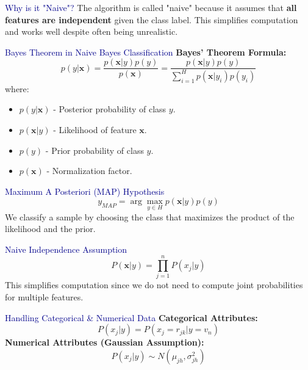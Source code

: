 \begin{frame}{\textcolor{darkblue}{Why is it "Naive"?}}
    The algorithm is called "naive" because it assumes that \textbf{all features are independent} given the class label.  
    This simplifies computation and works well despite often being unrealistic.
\end{frame}

\begin{frame}{\textcolor{darkblue}{Bayes Theorem in Naive Bayes Classification}}
    \textbf{Bayes' Theorem Formula:}
    \[
    p(y|\mathbf{x}) = \frac{p(\mathbf{x}|y)p(y)}{p(\mathbf{x})} = \frac{p(\mathbf{x}|y)p(y)}{\sum_{i=1}^H p(\mathbf{x}|y_i)p(y_i)}
    \]
    where:
    \begin{itemize}
        \item $ p(y|\mathbf{x}) $ - Posterior probability of class $ y $.
        \item $ p(\mathbf{x}|y) $ - Likelihood of feature $ \mathbf{x} $.
        \item $ p(y) $ - Prior probability of class $ y $.
        \item $ p(\mathbf{x}) $ - Normalization factor.
    \end{itemize}
\end{frame}

\begin{frame}{\textcolor{darkblue}{Maximum A Posteriori (MAP) Hypothesis}}
    \[
    y_{MAP} = \arg \max_{y \in H} p(\mathbf{x}|y)p(y)
    \]
    We classify a sample by choosing the class that maximizes the product of the likelihood and the prior.
\end{frame}

\begin{frame}{\textcolor{darkblue}{Naive Independence Assumption}}
    \[
    P(\mathbf{x}|y) = \prod_{j=1}^n P(x_j|y)
    \]
    This simplifies computation since we do not need to compute joint probabilities for multiple features.
\end{frame}

\begin{frame}{\textcolor{darkblue}{Handling Categorical & Numerical Data}}
    \textbf{Categorical Attributes:}
    \[
    P(x_j|y) = P(x_j = r_{jk} | y = v_n)
    \]
    \textbf{Numerical Attributes (Gaussian Assumption):}
    \[
    P(x_j|y) \sim N(\mu_{jh}, \sigma_{jh}^2)
    \]
\end{frame}

